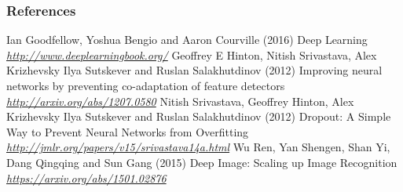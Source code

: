 \begin{vbframe}
\frametitle{References}
\footnotesize{
\begin{thebibliography}{99}
 Ian Goodfellow, Yoshua Bengio and Aaron Courville (2016)
\newblock Deep Learning
\newblock \emph{\url{http://www.deeplearningbook.org/}}
 Geoffrey E Hinton, Nitish Srivastava, Alex Krizhevsky Ilya Sutskever and Ruslan Salakhutdinov (2012)
\newblock Improving neural networks by preventing co-adaptation of feature detectors
\newblock \emph{\url{http://arxiv.org/abs/1207.0580}}
     Nitish Srivastava, Geoffrey Hinton, Alex Krizhevsky Ilya Sutskever and Ruslan Salakhutdinov (2012)
  \newblock Dropout:  A Simple Way to Prevent Neural Networks from Overfitting
  \newblock \emph{\url{http://jmlr.org/papers/v15/srivastava14a.html}}
 Wu Ren, Yan Shengen, Shan Yi, Dang Qingqing and Sun Gang (2015)
\newblock Deep Image: Scaling up Image Recognition
\newblock \emph{\url{https://arxiv.org/abs/1501.02876}}


\end{thebibliography}
}
\end{vbframe}

\endlecture

